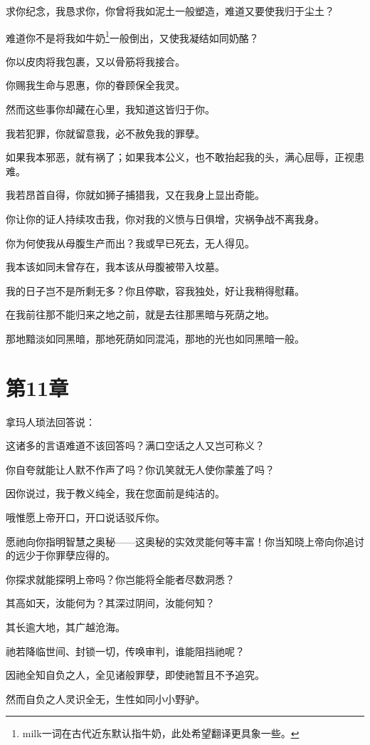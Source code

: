 \documentclass[12pt,oneside]{book}
\begin{document}
求你纪念，我恳求你，你曾将我如泥土一般塑造，难道又要使我归于尘土？

难道你不是将我如牛奶\footnote{milk一词在古代近东默认指牛奶，此处希望翻译更具象一些。}一般倒出，又使我凝结如同奶酪？

你以皮肉将我包裹，又以骨筋将我接合。

你赐我生命与恩惠，你的眷顾保全我灵。

然而这些事你却藏在心里，我知道这皆归于你。

我若犯罪，你就留意我，必不赦免我的罪孽。

如果我本邪恶，就有祸了；如果我本公义，也不敢抬起我的头，满心屈辱，正视患难。

我若昂首自得，你就如狮子捕猎我，又在我身上显出奇能。

你让你的证人持续攻击我，你对我的义愤与日俱增，灾祸争战不离我身。

你为何使我从母腹生产而出？我或早已死去，无人得见。

我本该如同未曾存在，我本该从母腹被带入坟墓。

我的日子岂不是所剩无多？你且停歇，容我独处，好让我稍得慰藉。

在我前往那不能归来之地之前，就是去往那黑暗与死荫之地。

那地黯淡如同黑暗，那地死荫如同混沌，那地的光也如同黑暗一般。



\chapter{第11章}
拿玛人琐法回答说：

这诸多的言语难道不该回答吗？满口空话之人又岂可称义？

你自夸就能让人默不作声了吗？你讥笑就无人使你蒙羞了吗？

因你说过，我于教义纯全，我在您面前是纯洁的。

哦惟愿上帝开口，开口说话驳斥你。

愿祂向你指明智慧之奥秘——这奥秘的实效灵能何等丰富！你当知晓上帝向你追讨的远少于你罪孽应得的。

你探求就能探明上帝吗？你岂能将全能者尽数洞悉？

其高如天，汝能何为？其深过阴间，汝能何知？

其长逾大地，其广越沧海。

祂若降临世间、封锁一切，传唤审判，谁能阻挡祂呢？

因祂全知自负之人，全见诸般罪孽，即使祂暂且不予追究。

然而自负之人灵识全无，生性如同小小野驴。
\end{document}
